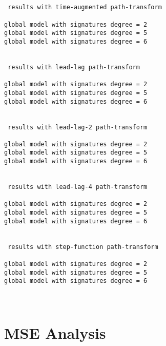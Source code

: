 \documentclass[11pt]{article}
\begin{document}
    \begin{Verbatim}[commandchars=\\\{\}]

 
 results with time-augmented path-transform 

global model with signatures degree = 2
global model with signatures degree = 5
global model with signatures degree = 6

 
 results with lead-lag path-transform 

global model with signatures degree = 2
global model with signatures degree = 5
global model with signatures degree = 6

 
 results with lead-lag-2 path-transform 

global model with signatures degree = 2
global model with signatures degree = 5
global model with signatures degree = 6

 
 results with lead-lag-4 path-transform 

global model with signatures degree = 2
global model with signatures degree = 5
global model with signatures degree = 6

 
 results with step-function path-transform 

global model with signatures degree = 2
global model with signatures degree = 5
global model with signatures degree = 6

    \end{Verbatim}

    \begin{center}
    \end{center}
    { \hspace*{\fill} \\}
    
    \section{MSE Analysis}\label{mse-analysis}
\end{document}
